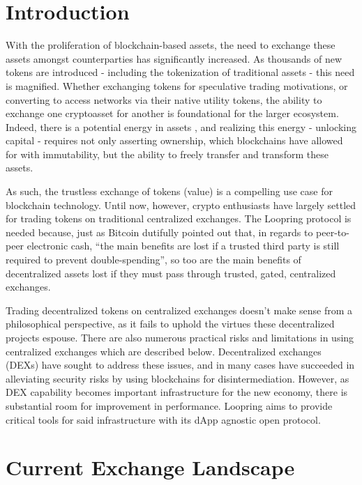 \documentclass[UTF8,nofonts]{article}
\begin{document}
\begin{multicols}{2}
\section{Introduction\label{sec:introduction}}

With the proliferation of blockchain-based assets, the need to exchange these assets amongst counterparties has significantly increased. As thousands of new tokens are introduced - including the tokenization of traditional assets - this need is magnified. Whether exchanging tokens for speculative trading motivations, or converting to access networks via their native utility tokens, the ability to exchange one cryptoasset for another is foundational for the larger ecosystem. Indeed, there is a potential energy in assets \cite{desotocapital}, and realizing this energy - unlocking capital - requires not only asserting ownership, which blockchains have allowed for with immutability,  but the ability to freely transfer and transform these assets.
 
As such, the trustless exchange of tokens (value) is a compelling use case for blockchain technology. Until now, however, crypto enthusiasts have largely settled for trading tokens on traditional centralized exchanges. The Loopring protocol is needed because, just as Bitcoin \cite{nakamoto2008bitcoin} dutifully pointed out that, in regards to peer-to-peer electronic cash, \enquote{the main benefits are lost if a trusted third party is still required to prevent double-spending}, so too are the main benefits of decentralized assets lost if they must pass through trusted, gated, centralized exchanges.

Trading decentralized tokens on centralized exchanges doesn't make sense from a philosophical perspective, as it fails to uphold the virtues these decentralized projects espouse. There are also numerous practical risks and limitations in using centralized exchanges which are described below. Decentralized exchanges (DEXs) \cite{schuh2015bitshares} \cite{bancor} \cite{kyber} have sought to address these issues, and in many cases have succeeded in alleviating security risks by using blockchains for disintermediation. However, as DEX capability becomes important infrastructure for the new economy, there is substantial room for improvement in performance. Loopring aims to provide critical tools for said infrastructure with its dApp agnostic open protocol. 

\section{Current Exchange Landscape\label{sec:current_exchange_landscape}}


\end{multicols}
\end{document}

